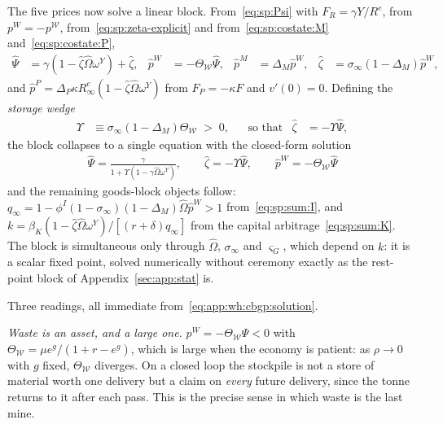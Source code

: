 The five prices now solve a linear block. From~\eqref{eq:sp:Psi} with $F_R=\gamma Y/R^e$, from $p^W=-p^{\mathcal W}$, from~\eqref{eq:sp:zeta-explicit} and from~\eqref{eq:sp:costate:M} and~\eqref{eq:sp:costate:P},
\begin{align}
\hat\Psi &= \gamma\left(1-\hat\zeta\hat\Omega\omega^Y\right)+\hat\zeta,
&
\hat p^W &= -\Theta_{\mathcal W}\hat\Psi,
&
\hat p^M &= \Delta_M\hat p^W,
&
\hat\zeta &= \sigma_\infty\left(1-\Delta_M\right)\hat p^W,
\label{eq:app:wh:cbgp:block}
\end{align}
and $\hat p^P=\Delta_P\kappa R^e_\infty\left(1-\hat\zeta\hat\Omega\omega^Y\right)$ from $F_P=-\kappa F$ and $v'\left(0\right)=0$. Defining the \emph{storage wedge}
\begin{align}
\Upsilon &\equiv \sigma_\infty\left(1-\Delta_M\right)\Theta_{\mathcal W}\;>\;0,
&&\text{so that}
&
\hat\zeta &= -\Upsilon\hat\Psi,
\label{eq:app:wh:cbgp:upsilon}
\end{align}
the block collapses to a single equation with the closed-form solution
\begin{align}
\boxed{\;\hat\Psi = \frac{\gamma}{1+\Upsilon\left(1-\gamma\hat\Omega\omega^Y\right)},
\qquad
\hat\zeta = -\Upsilon\hat\Psi,
\qquad
\hat p^W = -\Theta_{\mathcal W}\hat\Psi\;}
\label{eq:app:wh:cbgp:solution}
\end{align}
and the remaining goods-block objects follow: $q_\infty=1-\phi^I\left(1-\sigma_\infty\right)\left(1-\Delta_M\right)\hat\Omega\hat p^W>1$ from~\eqref{eq:sp:sum:I}, and $k=\beta_K\left(1-\hat\zeta\hat\Omega\omega^Y\right)/\left[\left(r+\delta\right)q_\infty\right]$ from the capital arbitrage~\eqref{eq:sp:sum:K}. The block is simultaneous only through $\hat\Omega$, $\sigma_\infty$ and $\varsigma_G$, which depend on $k$: it is a scalar fixed point, solved numerically without ceremony exactly as the rest-point block of Appendix~\ref{sec:app:stat} is.

 Three readings, all immediate from~\eqref{eq:app:wh:cbgp:solution}.

\emph{Waste is an asset, and a large one.} $p^W=-\Theta_{\mathcal W}\Psi<0$ with $\Theta_{\mathcal W}=\mu e^{g}/\left(1+r-e^{g}\right)$, which is large when the economy is patient: as $\rho\to0$ with $g$ fixed, $\Theta_{\mathcal W}$ diverges. On a closed loop the stockpile is not a store of material worth one delivery but a claim on \emph{every} future delivery, since the tonne returns to it after each pass. This is the precise sense in which waste is the last mine.

